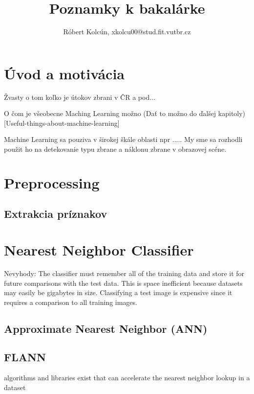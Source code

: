 \documentclass[10pt,a4paper]{article}
\begin{document}
\title{Poznamky k bakalárke}
\author{Róbert Kolcún, xkolcu00@stud.fit.vutbr.cz}
\maketitle


\section{Úvod a motivácia}
Žvasty o tom koľko je útokov zbrani v ČR a pod...

O čom je všeobecne Maching Learning možno (Dať to možno do ďalšej kapitoly)
[Useful-things-about-machine-learning]

Machine Learning sa pouziva v širokej škále oblasti npr .....
My sme sa rozhodli použit ho na detekovanie typu zbrane a náklonu zbrane v obrazovej scéne.



\section{Preprocessing}

\subsection{Extrakcia príznakov}



\section{Nearest Neighbor Classifier}

Nevyhody:
The classifier must remember all of the training data and store it for future comparisons with the test data. This is space inefficient because datasets may easily be gigabytes in size.
Classifying a test image is expensive since it requires a comparison to all training images.

\subsection{Approximate Nearest Neighbor (ANN)}

\subsection{FLANN}
algorithms and libraries exist that can accelerate the nearest neighbor lookup in a dataset
\end{document}
